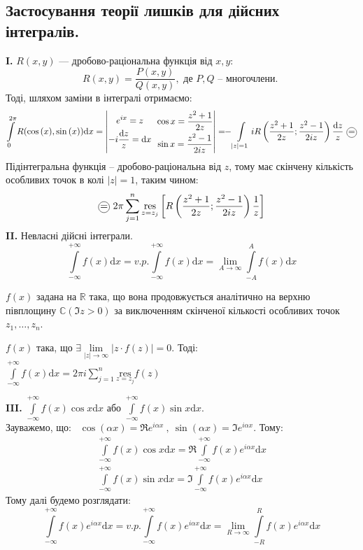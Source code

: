 \documentclass[a4paper]{scrartcl}
\theoremstyle{definition}
\theoremstyle{remark}
\theoremstyle{definition}
\theoremstyle{definition}
\newcommand*\circled[1]{\tikz[baseline=(char.base)]{
  \node[shape=circle,draw,inner sep=1pt] (char) {#1};}}
\def\i{\infty}                 %
\def\res#1{\underset{#1}{\mathrm{res}}}
\begin{document}
\subsection{ Застосування теорії лишків для дійсних інтегралів.}

\textbf{I.} $R(x,y)$ --- дробово-раціональна функція від $x,y$:
$$
R(x,y) = \frac{P(x,y)}{Q(x,y)} , \text{ де } P,Q \text{ -- многочлени. }
$$
Тоді, шляхом заміни в інтегралі отримаємо:
$$
 \int\limits_{0}^{2 \pi}{ R(\cos{(x)}, \sin{(x)}) \mathrm{d} x} = \left| \begin{gathered}
  e^{ix} = z\\
  -i  \frac{\mathrm{d} z}{z}  = \mathrm{d} x
 \end{gathered} \ \  \begin{gathered}
   \cos{x}  = \frac{z^2 + 1}{2 z} \\
   \sin{x} = \frac{z^2 - 1}{2iz}
 \end{gathered} \right|=\!\!  -\int\limits_{|z| = 1}^{ }{ i R \left( \frac{z^2 + 1}{2 z} ; \frac{z^2 - 1}{2iz}   \right) \frac{\mathrm{d} z}{z} } \ \circled{=}
$$
Підінтегральна функція -- дробово-раціональна від $z$, тому має скінчену кількість особливих точок в колі $|z| = 1$, таким чином:
$$
\circled{=}\   2\pi  \sum\limits_{j = 1}^{ n} { \res{z= z_j} \left[R \left( \frac{z^2 + 1}{2 z} ; \frac{z^2 - 1}{2iz}   \right) \frac{1}{z}  \right]}
$$
\textbf{II.} Невласні дійсні інтеграли.
$$
 \int\limits_{- \infty}^{ +\infty}{ f(x) \mathrm{d} x} = v.p.  \int\limits_{-\infty}^{ +\infty}{ f(x) \mathrm{d} x } =  \lim\limits_{A\to  \infty}{ \int\limits_{-A}^{A}{f(x) \mathrm{d} x}}
$$

\begin{boxteo}
 $f(x)$ задана на $\mathbb{R}$ така, що вона продовжується аналітично на верхню півплощину $\mathbb{C} (\Im z > 0)$ за виключенням
 скінченої кількості особливих точок $z_1 , \dots , z_n$.\par
 $f(x)$ така, що $\exists  \lim\limits_{|z|\to  \infty}{ \left| z \cdot f(z) \right| } = 0$. Тоді: \
 $
\displaystyle  \int\limits_{-\infty}^{ +\infty}{ f(x) \mathrm{d} x } = 2 \pi i  \sum\limits_{j =1 }^{n}{\res{z = z_j} f(z)}
 $
\end{boxteo}


\textbf{III.} $\displaystyle   \int\limits_{-\i}^{ +\infty}{f(x) \cos{x} \mathrm{d} x}$ або $\displaystyle   \int\limits_{-\i}^{ +\infty}{f(x) \sin{x} \mathrm{d} x}$.\\

Зауважемо, що: \ $
  \cos{(\alpha x)} = \Re e^{i \alpha x}\ , \
  \sin{(\alpha x)} = \Im e^{i \alpha x}
$. Тому:
$$
\begin{gathered}
\int\limits_{-\i}^{ +\infty}{f(x) \cos{x} \mathrm{d} x} =\Re  \int\limits_{-\i}^{ +\infty}{f(x) e^{i \alpha x} \mathrm{d} x} \\
\int\limits_{-\i}^{ +\infty}{f(x) \sin{x} \mathrm{d} x} =\Im  \int\limits_{-\i}^{ +\infty}{f(x) e^{i \alpha x} \mathrm{d} x}
\end{gathered}
$$
Тому далі будемо розглядати:
$$
 \int\limits_{-\i}^{ +\infty}{f(x) e^{i \alpha x} \mathrm{d} x} = v.p.  \int\limits_{-\i}^{ +\infty}{f(x) e^{i \alpha x} \mathrm{d} x} = \lim\limits_{R \to  \infty}{
 \int\limits_{-R}^{ R}{f(x) e^{i \alpha x} \mathrm{d} x}
 }
$$
\end{document}
